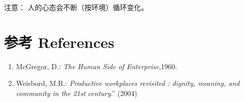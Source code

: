 注意： 人的心态会不断（按环境）循环变化。

\hypertarget{ux9644ux4ef6}{%
\section{参考 References}\label{ux9644ux4ef6}}

\begin{enumerate}
\tightlist
\item
  McGregor, D.: \emph{The Human Side of Enterprise},1960.\\
\item
  Weisbord, M.R.: \emph{Productive workplaces revisited : dignity,
  meaning, and community in the 21st century}.'' (2004)
\end{enumerate}




